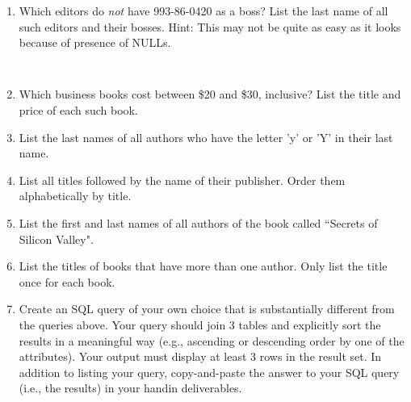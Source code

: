 \documentclass{article}
\begin{document}
\begin{enumerate}
\item Which editors do \textit{not} have 993-86-0420 as a boss? List the last name of all such editors and their bosses. Hint: This may not be quite as easy as it looks because of presence of NULLs.
	\begin{verbatim}
	
	\end{verbatim}

\item Which business books cost between \$20 and \$30, inclusive? List the title and price of each such book.\\

\item List the last names of all authors who have the letter 'y' or 'Y' in their last name.\\

\item List all titles followed by the name of their publisher. Order them alphabetically by title.\\

\item List the first and last names of all authors of the book called ``Secrets of Silicon Valley". \\

\item List the titles of books that have more than one author. Only list the title once for each book. \\

\item Create an SQL query of your own choice that is substantially different from the queries above. Your query should join 3 tables and explicitly sort the results in a meaningful way (e.g., ascending or descending order by one of the attributes). Your output must display at least 3 rows in the result set. In addition to listing your query, copy-and-paste the answer to your SQL query (i.e., the results) in your handin deliverables.

	
\end{enumerate}
\end{document}
